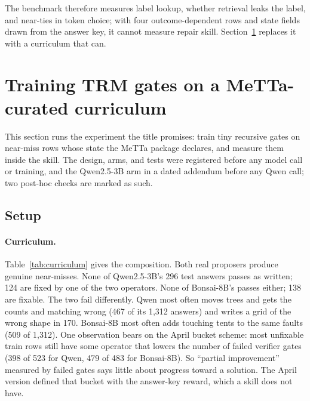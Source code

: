 \documentclass[11pt]{article}
\begin{document}
The benchmark therefore measures label lookup, whether retrieval leaks the label, and near-ties in token choice; with four outcome-dependent rows and state fields drawn from the answer key, it cannot measure repair skill. Section~\ref{sec:training} replaces it with a curriculum that can.

\section{Training TRM gates on a MeTTa-curated curriculum}
\label{sec:training}

This section runs the experiment the title promises: train tiny recursive gates on near-miss rows whose state the MeTTa package declares, and measure them inside the skill. The design, arms, and tests were registered before any model call or training, and the Qwen2.5-3B arm in a dated addendum before any Qwen call; two post-hoc checks are marked as such.

\subsection{Setup}

\paragraph{Curriculum.} Table~\ref{tab:curriculum} gives the composition. Both real proposers produce genuine near-misses. None of Qwen2.5-3B's 296 test answers passes as written; 124 are fixed by one of the two operators. None of Bonsai-8B's passes either; 138 are fixable. The two fail differently. Qwen most often moves trees and gets the counts and matching wrong (467 of its 1{,}312 answers) and writes a grid of the wrong shape in 170. Bonsai-8B most often adds touching tents to the same faults (509 of 1{,}312). One observation bears on the April bucket scheme: most unfixable train rows still have some operator that lowers the number of failed verifier gates (398 of 523 for Qwen, 479 of 483 for Bonsai-8B). So ``partial improvement'' measured by failed gates says little about progress toward a solution. The April version defined that bucket with the answer-key reward, which a skill does not have.

\begin{table}[t]
  \centering
  \small
  
  \caption{The Campsite curriculum by candidate source, pool, and label (the first menu action whose result passes the verifier). Synthetic rows are eight defect types per puzzle where constructible.}
  \label{tab:curriculum}
\end{table}
\end{document}
